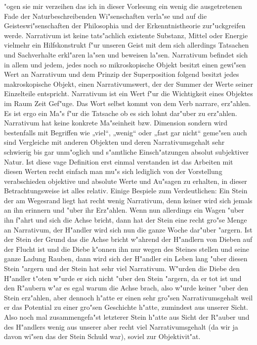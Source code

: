 \documentclass[a5paper,8pt]{book}
\begin{document}
"ogen sie mir verzeihen das ich in dieser Vorlesung ein wenig die ausgetretenen Fade der Naturbeschreibenden Wi"senschaften verla"se und auf die Geisteswi"senschaften der Philosophia und der Erkenntnistheorie zur"uckgreifen werde.
Narrativum ist keine tats"achlich existente Substanz, Mittel oder Energie vielmehr ein Hilfskonstrukt f"ur unseren Geist mit dem sich allerdings Tatsachen und Sachverhalte erkl"aren la"sen und beweisen la"sen. Narrativum befindet sich in allem und jedem, jedes noch so mikroskopische Objekt besitzt einen gewi"sen Wert an Narrativum und dem Prinzip der Superposition folgend besitzt jedes makroskopische Objekt, einen Narrativumswert, der der Summer der Werte seiner Einzelteile entspricht.
Narrativum ist ein Wert f"ur die Wichtigkeit eines Objektes im Raum Zeit Gef"uge. Das Wort selbst kommt von dem Verb narrare, erz"ahlen. Es ist ergo ein Ma"s f"ur die Tatsache ob es sich lohnt dar"uber zu erz"ahlen. Narrativum hat keine konkrete Ma"seinheit bzw. Dimension sondern wird bestenfalls mit Begriffen wie „viel“, „wenig“ oder „fast gar nicht“ geme"sen auch sind Vergleiche mit anderen Objekten und deren Narrativumsgehalt sehr schwierig bis gar unm"oglich und s"amtliche Einsch"atzungen absolut subjektiver Natur.
Ist diese vage Definition erst einmal verstanden ist das Arbeiten mit diesen Werten recht einfach man mu"s sich lediglich von der Vorstellung verabschieden objektive und absolute Werte und Au"sagen zu erhalten, in dieser Betrachtungsweise ist alles relativ.
Einige Bespiele zum Verdeutlichen:
Ein Stein der am Wegesrand liegt hat recht wenig Narrativum, denn keiner wird sich jemals an ihn erinnern und "uber ihr Erz"ahlen. Wenn nun allerdings ein Wagen "uber ihn f"ahrt und sich die Achse bricht, dann hat der Stein eine recht gro"se Menge an Narrativum, der H"andler wird sich nun die ganze Woche dar"uber "argern. Ist der Stein der Grund das die Achse bricht w"ahrend der H"andlern von Dieben auf der Flucht ist und die Diebe k"onnen ihn nur wegen des Steines stellen und seine ganze Ladung Rauben, dann wird sich der H"andler ein Leben lang "uber diesen Stein "argern und der Stein hat sehr viel Narrativum. W"urden die Diebe den H"andler t"oten w"urde er sich nicht "uber den Stein "argern, da er tot ist und den R"aubern w"ar es egal warum die Achse brach, also w"urde keiner "uber den Stein erz"ahlen, aber dennoch h"atte er einen sehr gro"sen Narrativumsgehalt weil er das Potential zu einer gro"sen Geschichte h"atte, zumindest aus unserer Sicht. Also noch mal zusammengefa"st letzterer Stein h"atte aus 
Sicht der R"auber und des H"andlers wenig aus unserer aber recht viel Narrativumsgehalt (da wir ja davon wi"sen das der Stein Schuld war), soviel zur Objektivit"at.
\end{document}
